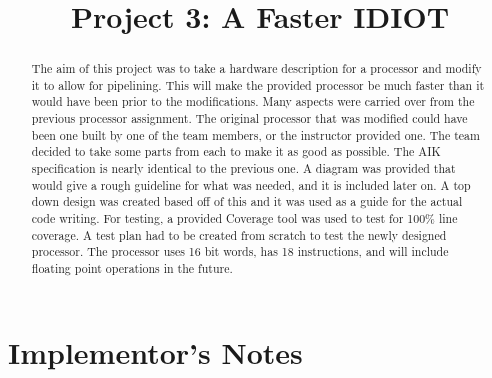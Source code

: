 \documentclass[conference]{IEEEtran}
\begin{document}
\title{Project 3: A Faster IDIOT}


\author{}


\maketitle

\begin{abstract}
The aim of this project was to take a hardware description for a processor and modify it to allow for pipelining. This will make the provided processor be much faster than it would have been prior to the modifications. Many aspects were carried over from the previous processor assignment. The original processor that was modified could have been one built by one of the team members, or the instructor provided one. The team decided to take some parts from each to make it as good as possible. The AIK specification is nearly identical to the previous one. A diagram was provided that would give a rough guideline for what was needed, and it is included later on. A top down design was created based off of this and it was used as a guide for the actual code writing. For testing, a provided Coverage tool was used to test for 100\% line coverage.  A test plan had to be created from scratch to test the newly designed processor. The processor uses 16 bit words, has 18 instructions, and will include floating point operations in the future.
\end{abstract}




%
\IEEEpeerreviewmaketitle



\section{Implementor's Notes}
\end{document}
